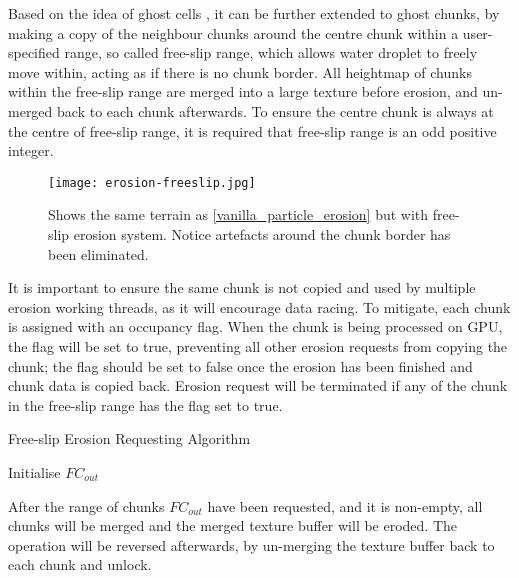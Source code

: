 \documentclass[oneside, a4paper]{report}
\begin{document}
    Based on the idea of ghost cells \cite{cell_based_erosion}, it can be further extended to ghost chunks, by making a copy of the neighbour chunks around the centre chunk within a user-specified range, so called free-slip range, which allows water droplet to freely move within, acting as if there is no chunk border. All heightmap of chunks within the free-slip range are merged into a large texture before erosion, and un-merged back to each chunk afterwards. To ensure the centre chunk is always at the centre of free-slip range, it is required that free-slip range is an odd positive integer.

    \begin{figure}[H]
        \texttt{[image: erosion-freeslip.jpg]}
        \caption{Shows the same terrain as \ref{vanilla_particle_erosion} but with free-slip erosion system. Notice artefacts around the chunk border has been eliminated.}
        \label{freeslip_particle_erosion}
    \end{figure}

    It is important to ensure the same chunk is not copied and used by multiple erosion working threads, as it will encourage data racing. To mitigate, each chunk is assigned with an occupancy flag. When the chunk is being processed on GPU, the flag will be set to true, preventing all other erosion requests from copying the chunk; the flag should be set to false once the erosion has been finished and chunk data is copied back. Erosion request will be terminated if any of the chunk in the free-slip range has the flag set to true.

    \begin{algorithm}[H]
        \caption{Free-slip Erosion Requesting Algorithm}
        
        Initialise \(FC_{out}\)\;


    \end{algorithm}

    After the range of chunks \(FC_{out}\) have been requested, and it is non-empty, all chunks will be merged and the merged texture buffer will be eroded. The operation will be reversed afterwards, by un-merging the texture buffer back to each chunk and unlock.
\end{document}
